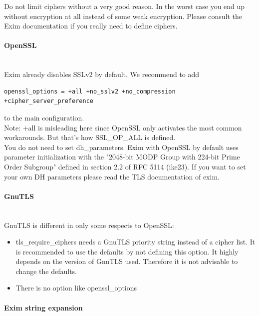 Do not limit ciphers without a very good reason. In the worst case you end up without encryption at all instead of some weak encryption. Please consult the Exim documentation if you really need to define ciphers.

\paragraph*{OpenSSL}\mbox{}\\
Exim already disables SSLv2 by default. We recommend to add
\begin{lstlisting}[breaklines]
  openssl_options = +all +no_sslv2 +no_compression +cipher_server_preference
\end{lstlisting}
to the main configuration.\\
Note: +all is misleading here since OpenSSL only activates the most common workarounds. But that's how SSL\_OP\_ALL is defined.\\

You do not need to set dh\_parameters. Exim with OpenSSL by default uses parameter initialization with the "2048-bit MODP Group with 224-bit Prime Order Subgroup" defined in section 2.2 of RFC 5114 (ike23).
If you want to set your own DH parameters please read the TLS documentation of exim.\\



\paragraph*{GnuTLS}\mbox{}\\

GnuTLS is different in only some respects to OpenSSL:
\begin{itemize}
\item tls\_require\_ciphers needs a GnuTLS priority string instead of a cipher list. It is recommended to use the defaults by not defining this option. It highly depends on the version of GnuTLS used. Therefore it is not advisable to change the defaults.
\item There is no option like openssl\_options
\end{itemize}

\paragraph*{Exim string expansion}\mbox{}\\


